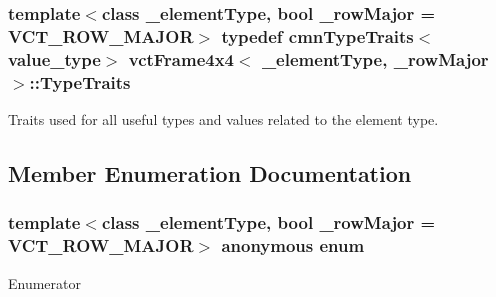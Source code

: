\hypertarget{classvct_frame4x4_af8bf02c629bad73636da990ce9106fcf}{
\subsubsection[{Type\-Traits}]{\setlength{\rightskip}{0pt plus 5cm}template$<$class \-\_\-element\-Type, bool \-\_\-row\-Major = V\-C\-T\-\_\-\-R\-O\-W\-\_\-\-M\-A\-J\-O\-R$>$ typedef {\bf cmn\-Type\-Traits}$<$value\-\_\-type$>$ {\bf vct\-Frame4x4}$<$ \-\_\-element\-Type, \-\_\-row\-Major $>$\-::{\bf Type\-Traits}}}\label{classvct_frame4x4_af8bf02c629bad73636da990ce9106fcf}
Traits used for all useful types and values related to the element type. 

\subsection{Member Enumeration Documentation}
\hypertarget{classvct_frame4x4_ab47fb26bf5a63b1dd8dc3257181103ed}{\subsubsection[{anonymous enum}]{\setlength{\rightskip}{0pt plus 5cm}template$<$class \-\_\-element\-Type, bool \-\_\-row\-Major = V\-C\-T\-\_\-\-R\-O\-W\-\_\-\-M\-A\-J\-O\-R$>$ anonymous enum}}\label{classvct_frame4x4_ab47fb26bf5a63b1dd8dc3257181103ed}
\begin{Desc}
\item[Enumerator]\par
\begin{description}
\item[{\em 
\hypertarget{classvct_frame4x4_ab47fb26bf5a63b1dd8dc3257181103eda76a3fe8d4faebc4fd854e2a2768f7dae}{R\-O\-W\-S}\label{classvct_frame4x4_ab47fb26bf5a63b1dd8dc3257181103eda76a3fe8d4faebc4fd854e2a2768f7dae}
}]\item[{\em 
\hypertarget{classvct_frame4x4_ab47fb26bf5a63b1dd8dc3257181103eda7c50eb46d3929353c661aa63859a5b45}{C\-O\-L\-S}\label{classvct_frame4x4_ab47fb26bf5a63b1dd8dc3257181103eda7c50eb46d3929353c661aa63859a5b45}
}]\end{description}
\end{Desc}
